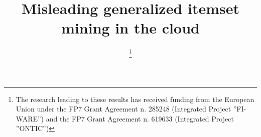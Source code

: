 \documentclass[10pt, conference, compsocconf]{IEEEtran}
\begin{document}
%
\title{Misleading generalized itemset mining in the cloud}


\IEEEoverridecommandlockouts
\author{


\thanks{The research leading to these results has received funding from the European Union 
under the FP7 Grant Agreement n. 285248 (Integrated Project ”FI-WARE”) and 
the FP7 Grant Agreement n. 619633 (Integrated Project ”ONTIC”)} 
}


%



\maketitle
\end{document}
